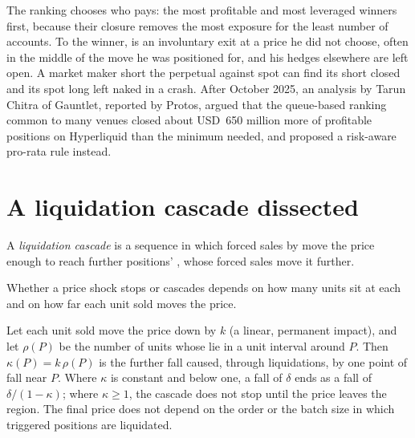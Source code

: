 The ranking chooses who pays: the most profitable and most leveraged winners first, because their closure removes
the most exposure for the least number of accounts. To the winner,  is an involuntary exit at a price
he did not choose, often in the middle of the move he was positioned for, and his hedges elsewhere are left open. A
market maker short the perpetual against spot can find its short closed and its spot long left naked in a crash. After
October 2025, an analysis by Tarun Chitra of Gauntlet, reported by Protos, argued that the queue-based ranking common
to many venues closed about USD~650 million more of profitable positions on Hyperliquid than the minimum needed, and
proposed a risk-aware pro-rata rule instead.

\section{A liquidation cascade dissected}

\begin{definition}\label{def:m3:margin-liquidation-and-loss-allocation:cascade}
A \emph{liquidation cascade} is a sequence in which forced sales by 
move the price enough to reach further positions' , whose forced sales move it further.
\end{definition}

Whether a price shock stops or cascades depends on how many units sit at each  and on how far each
unit sold moves the price.

\begin{proposition}\label{prop:m3:margin-liquidation-and-loss-allocation:kappa}
Let each unit sold move the price down by $k$ (a linear, permanent impact), and let $\rho(P)$ be the number of units
whose  lie in a unit interval around $P$. Then $\kappa(P) = k\,\rho(P)$ is the further fall caused,
through liquidations, by one point of fall near $P$. Where $\kappa$ is constant and below one, a fall of $\delta$ ends
as a fall of $\delta/(1 - \kappa)$; where $\kappa \ge 1$, the cascade does not stop until the price leaves the region.
The final price does not depend on the order or the batch size in which triggered positions are liquidated.
\end{proposition}

